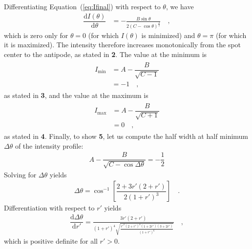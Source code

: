 \documentclass[modern]{aastex62}
\begin{document}
Differentiating Equation~(\ref{eq:Ifinal}) with respect to $\theta$, we have
%
\begin{align}
    \label{eq:Ideriv}
    \dfrac{\mathrm{d}I(\theta)}{\mathrm{d}\theta} & =
    -\frac{B\sin\theta}{2(C - \cos\theta)^\frac{3}{2}}
    \quad,
\end{align}
%
which is zero only for $\theta = 0$ (for which $I(\theta)$ is
minimized) and $\theta = \pi$ (for which it is maximized). The intensity
therefore increases monotonically from the spot center to the antipode,
as stated in \textbf{2}. The value at the minimum is
%
\begin{align}
    \begin{split}
        I_{\mathrm{min}} & = A - \dfrac{B}{\sqrt{C - 1}} \\
        & = -1
        \quad,
    \end{split}
\end{align}
%
as stated in \textbf{3}, and the value at the maximum is
%
\begin{align}
    \begin{split}
        I_{\mathrm{max}} & = A - \dfrac{B}{\sqrt{C + 1}} \\
        & = 0
        \quad,
    \end{split}
\end{align}
%
as stated in \textbf{4}.
Finally, to show \textbf{5}, let us compute the half width at half minimum
$\Delta\theta$ of the intensity profile:
%
\begin{align}
    A - \dfrac{B}{\sqrt{C - \cos{\Delta\theta}}} =
    -\dfrac{1}{2}
\end{align}
%
Solving for $\Delta\theta$ yields
%
\begin{align}
    \label{eq:hwhm}
    \Delta\theta =
    \cos^{-1} \left[ \dfrac{2 + 3 r' (2 + r')}{2 (1 + r')^3} \right]
    \quad.
\end{align}
%
Differentiation with respect to $r'$ yields
%
\begin{align}
    \dfrac{\mathrm{d}\Delta\theta}{\mathrm{d}r'} =
    \frac{3 r' \left(2 + r'\right)}{\left(1 + r'\right)^4
        \sqrt{\frac{r'^2 \left(2 + r'\right)^2 \left(1 + 2 r'\right)
                \left(3 + 2 r'\right)}{\left(1 + r'\right)^6}}}
    \quad,
\end{align}
%
which is positive definite for all $r' > 0$.
\end{document}
